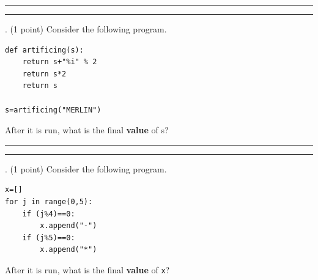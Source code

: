 \documentclass{article}
\begin{document}
\vspace*{2em}
\hrule
\vspace{2em}

\vspace{2em}
\hrule height 2pt


\newpage
{}. (1 point)
Consider the following program.
\begin{verbatim}
def artificing(s):
    return s+"%i" % 2
    return s*2
    return s

s=artificing("MERLIN")
\end{verbatim}
After it is run, what is the final \textbf{value} of s?



\vspace*{2em}
\hrule
\vspace{2em}

\vspace{2em}
\hrule height 2pt


\newpage
{}. (1 point)
Consider the following program.
\begin{verbatim}
x=[]
for j in range(0,5):
    if (j%4)==0:
        x.append("-")
    if (j%5)==0:
        x.append("*")
\end{verbatim}
After it is run, what is the final \textbf{value} of \texttt{x}?
\end{document}
